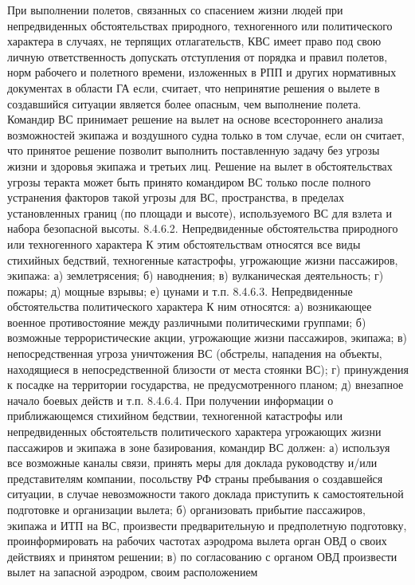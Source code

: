 При выполнении полетов, связанных со спасением жизни людей при непредвиденных обстоятельствах природного, техногенного или политического характера в случаях, не терпящих отлагательств, КВС имеет право под свою личную ответственность допускать отступления от порядка и правил полетов, норм рабочего и полетного времени, изложенных в РПП и других нормативных документах в области ГА если, считает, что непринятие решения о вылете в создавшийся ситуации является более опасным, чем выполнение полета. 
Командир ВС принимает решение на вылет на основе всестороннего анализа возможностей экипажа и воздушного судна только в том случае, если он считает, что принятое решение позволит выполнить поставленную задачу без угрозы жизни и здоровья экипажа и третьих лиц. 
Решение на вылет в обстоятельствах угрозы теракта может быть принято командиром ВС только после полного устранения факторов такой угрозы для ВС, пространства, в пределах установленных границ (по площади и высоте), используемого ВС для взлета и набора безопасной высоты. 
8.4.6.2. Непредвиденные обстоятельства природного или техногенного характера 
К этим обстоятельствам относятся все виды стихийных бедствий, техногенные катастрофы, угрожающие жизни пассажиров, экипажа: 
а)	землетрясения; 
б)	наводнения; 
в)	вулканическая деятельность; 
г)	пожары; 
д)	мощные взрывы; 
е)	цунами и т.п. 
8.4.6.3. Непредвиденные обстоятельства политического характера
К ним относятся:
а)	возникающее военное противостояние между различными политическими группами; 
б)	возможные террористические акции, угрожающие жизни пассажиров, экипажа; 
в) непосредственная угроза уничтожения ВС (обстрелы, нападения на объекты, находящиеся в непосредственной близости от места стоянки ВС); 
г) принуждения к посадке на территории государства, не предусмотренного планом; 
д) внезапное начало боевых действ и т.п.
8.4.6.4. При получении информации о приближающемся стихийном бедствии, техногенной катастрофы или непредвиденных обстоятельств политического характера угрожающих жизни пассажиров и экипажа в зоне базирования, командир ВС должен:
а)	используя все возможные каналы связи, принять меры для доклада руководству и/или представителям компании, посольству РФ страны пребывания о создавшейся ситуации, в случае невозможности такого доклада приступить к самостоятельной подготовке и организации вылета; 
б)	организовать прибытие пассажиров, экипажа и ИТП на ВС, произвести предварительную и предполетную подготовку, проинформировать на рабочих частотах аэродрома вылета орган ОВД о своих действиях и принятом решении; 
в)	по согласованию с органом ОВД произвести вылет на запасной аэродром, своим расположением 
